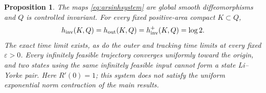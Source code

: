 \documentclass[11pt]{amsart}
\newtheorem{proposition}[theorem]{Proposition}
\theoremstyle{definition}
\theoremstyle{remark}
\numberwithin{equation}{section}
\begin{document}
\begin{proposition}\label{prop:arsinh}
The maps \eqref{eq:arsinhsystem} are global smooth diffeomorphisms
and $Q$ is controlled invariant. For every fixed positive-area
compact $K\subset Q$,
\begin{equation}\label{eq:arsinhentropies}
h_{\rm inv}(K,Q)=h_{\rm out}(K,Q)=h_{\rm inv}^+(K,Q)=\log2.
\end{equation}
The exact time limit exists, as do the outer and tracking time
limits at every fixed $\varepsilon>0$. Every infinitely feasible
trajectory converges uniformly toward the origin, and two states
using the same infinitely feasible input cannot form a state
Li--Yorke pair. Here $R'(0)=1$; this system does not satisfy
the uniform exponential norm contraction of the main results.
\end{proposition}
\end{document}
